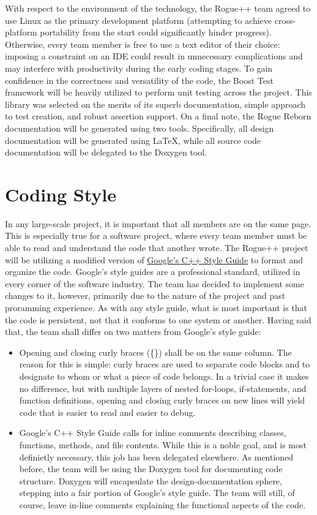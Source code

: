 \documentclass{article}
\begin{document}
With respect to the environment of the technology, the Rogue++ team agreed to use Linux as the primary development platform (attempting to achieve cross-platform portability from the start could significantly hinder progress).  Otherwise, every team member is free to use a text editor of their choice: imposing a constraint on an IDE could result in unnecessary complications and may interfere with productivity during the early coding stages.  To gain confidence in the correctness and versatility of the code, the Boost Test framework will be heavily utilized to perform unit testing across the project.  This library was selected on the merits of its superb documentation, simple approach to test creation, and robust assertion support.  On a final note, the Rogue Reborn documentation will be generated using two tools.  Specifically, all design documentation will be generated using LaTeX, while all source code documentation will be delegated to the Doxygen tool.

\section{Coding Style}

In any large-scale project, it is important that all members are on the same page. This is especially true for a software project, where every team member must be able to read and understand the code that another wrote. The Rogue++ project will be utilizing a modified version of \href{https://google.github.io/styleguide/cppguide.html}{Google's C++ Style Guide} to format and organize the code. Google's style guides are a professional standard, utilized in every corner of the software industry. The team has decided to implement some changes to it, however, primarily due to the nature of the project and past proramming experience. As with any style guide, what is most important is that the code is persistent, not that it conforms to one system or another. Having said that, the team shall differ on two matters from Google's style guide:

\begin{itemize}
	\item Opening and closing curly braces (\{\}) shall be on the same column. The reason for this is simple: curly braces are used to separate code blocks and to designate to whom or what a piece of code belongs. In a trivial case it makes no difference, but with multiple layers of nested for-loops, if-statements, and function definitions, opening and closing curly braces on new lines will yield code that is easier to read and easier to debug.
	\item Google's C++ Style Guide calls for inline comments describing classes, functions, methods, and file contents. While this is a noble goal, and is most definietly necessary, this job has been delegated elsewhere. As mentioned before, the team will be using the Doxygen tool for documenting code structure. Doxygen will encapsulate the design-documentation sphere, stepping into a fair portion of Google's style guide. The team will still, of course, leave in-line comments explaining the functional aspects of the code.

\end{itemize}
\end{document}
